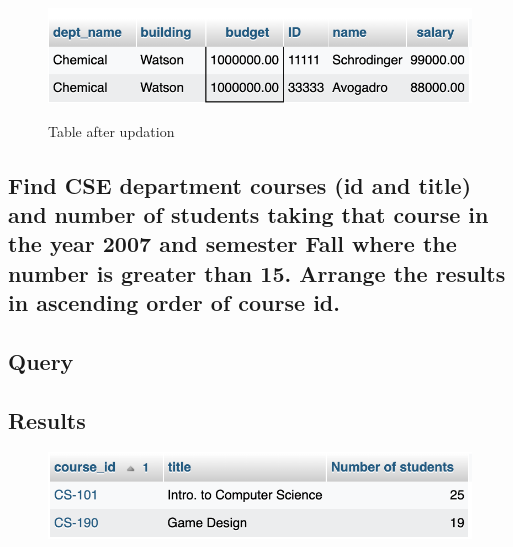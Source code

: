 \documentclass[12pt]{article}
\begin{document}
\begin{figure}[!hbt]
    \centering
    \includegraphics[scale=1.1]{screenshots/8c 2.png}
    \label{fig:my_label1}
    \caption{Table after updation}
\end{figure}
\newpage

\subsection{Find CSE department courses (id and title) and number of students taking that course in the year 2007 and semester Fall where the number is greater than 15. Arrange the results in ascending order of course id.}

\subsection*{Query}

\subsection*{Results}
\begin{figure}[!hbt]
    \centering
    \includegraphics[scale=1.2]{screenshots/8d.png}
    \label{fig:my_label1}
\end{figure}
\end{document}
